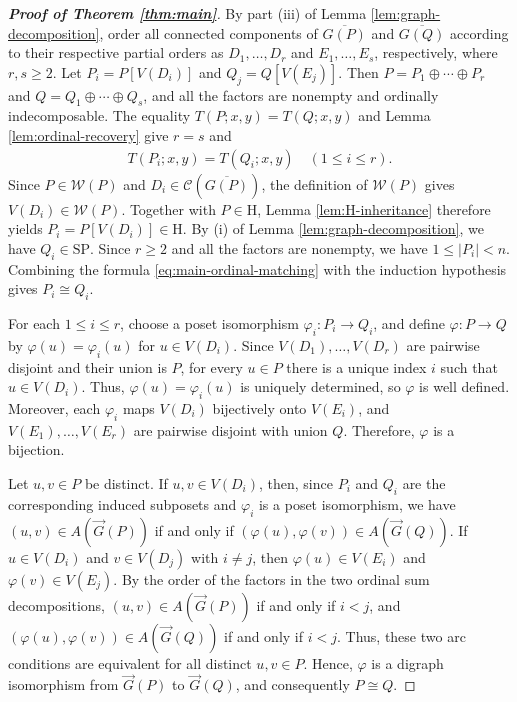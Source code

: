\documentclass[10pt,a4paper]{amsart}
\begin{document}
\begin{proof}[\rm\textbf{Proof of Theorem \ref{thm:main}}]
By part \textup{(iii)} of Lemma \ref{lem:graph-decomposition},
order all connected components of $\overline{G(P)}$ and
$\overline{G(Q)}$ according to their respective partial orders as
$D_1,\ldots,D_r$ and $E_1,\ldots,E_s$, respectively, where $r,s\geq2$.
Let $P_i=P[V(D_i)]$ and $Q_j=Q[V(E_j)]$.
Then $P=P_1\oplus\cdots\oplus P_r$ and
$Q=Q_1\oplus\cdots\oplus Q_s$,
and all the factors are nonempty and ordinally indecomposable.
The equality $T(P;x,y)=T(Q;x,y)$ and  Lemma \ref{lem:ordinal-recovery} give $r=s$ and
\begin{eqnarray}\label{eq:main-ordinal-matching}
T(P_i;x,y)=T(Q_i;x,y)\quad(1\leq i\leq r).
\end{eqnarray}
Since $P\in\mathcal W(P)$ and $D_i\in\mathcal C(\overline{G(P)})$,
the definition of $\mathcal W(P)$ gives $V(D_i)\in\mathcal W(P)$.
Together with $P\in\mathrm H$, Lemma \ref{lem:H-inheritance} therefore yields $P_i=P[V(D_i)]\in\mathrm H$.
By \textup{(i)} of Lemma \ref{lem:graph-decomposition}, we have $Q_i\in\mathrm{SP}$.
Since $r\geq2$ and all the factors are nonempty, we have $1\leq|P_i|<n$.
Combining the formula \eqref{eq:main-ordinal-matching} with the induction hypothesis gives $P_i\cong Q_i$.

For each $1\leq i\leq r$, choose a poset isomorphism
$\varphi_i:P_i\to Q_i$, and define $\varphi:P\to Q$ by
$\varphi(u)=\varphi_i(u)$ for $u\in V(D_i)$.
Since $V(D_1),\ldots,V(D_r)$ are pairwise disjoint
and their union is $P$, for every $u\in P$
there is a unique index $i$ such that $u\in V(D_i)$.
Thus, $\varphi(u)=\varphi_i(u)$ is uniquely determined,
so $\varphi$ is well defined.
Moreover, each $\varphi_i$ maps $V(D_i)$ bijectively onto $V(E_i)$,
and $V(E_1),\ldots,V(E_r)$ are pairwise disjoint with union $Q$.
Therefore, $\varphi$ is a bijection.

Let $u,v\in P$ be distinct. If $u,v\in V(D_i)$, then, since $P_i$ and $Q_i$
are the corresponding induced subposets and $\varphi_i$
is a poset isomorphism, we have $(u,v)\in A(\vec G(P))$ if and only if
$(\varphi(u),\varphi(v))\in A(\vec G(Q))$.
If $u\in V(D_i)$ and $v\in V(D_j)$ with $i\neq j$,
then $\varphi(u)\in V(E_i)$ and $\varphi(v)\in V(E_j)$.
By the order of the factors in the two ordinal sum decompositions,
$(u,v)\in A(\vec G(P))$ if and only if $i<j$,
and $(\varphi(u),\varphi(v))\in A(\vec G(Q))$ if and only if $i<j$.
Thus, these two arc conditions are equivalent for all distinct $u,v\in P$.
Hence, $\varphi$ is a digraph isomorphism from $\vec G(P)$ to $\vec G(Q)$,
and consequently $P\cong Q$.


\end{proof}
\end{document}

